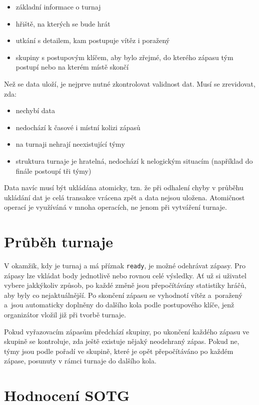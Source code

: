 \begin{itemize}
 \item základní informace o turnaj
 \item hřiště, na kterých se bude hrát
 \item utkání s detailem, kam postupuje vítěz i poražený
 \item skupiny s postupovým klíčem, aby bylo zřejmé, do kterého zápasu tým postupí nebo na kterém místě skončí
\end{itemize}

Než se data uloží, je nejprve nutné zkontrolovat validnost dat. Musí se zrevidovat, zda: 

\begin{itemize}
 \item nechybí data
 \item nedochází k časové i místní kolizi zápasů
 \item na turnaji nehrají neexistující týmy
 \item struktura turnaje je hratelná, nedochází k nelogickým situacím (například do finále postoupí tři týmy)
\end{itemize}

Data navíc musí být ukládána atomicky, tzn. že při odhalení chyby v průběhu ukládání dat je celá transakce
vrácena zpět a data nejsou uložena. Atomičnost operací je využíváná v mnoha operacích,
ne jenom při vytváření turnaje.

\section{Průběh turnaje}

V okamžik, kdy je turnaj a má příznak \texttt{ready}, je možné odehrávat zápasy.
Pro zápasy lze vkládat body jednotlivě nebo rovnou celé výsledky.
Ať už si uživatel vybere jakkýkoliv způsob, po každé změně jsou přepočítávány
statistiky hráčů, aby byly co nejaktuálnější. Po skončení zápasu se vyhodnotí vítěz
a~poražený a~jsou automaticky doplněny do dalšího kola podle postupového klíče,
jenž organizátor vložil již při tvorbě turnaje.

Pokud vyřazovacím zápasům předchází skupiny, po ukončení každého zápasu ve skupině se kontroluje,
zda ještě existuje nějaký neodehraný zápas. Pokud ne, týmy jsou podle pořadí ve skupině, které je
opět přepočítáváno po každém zápase, posunuty v rámci turnaje do dalšího kola.


\section{Hodnocení SOTG}


